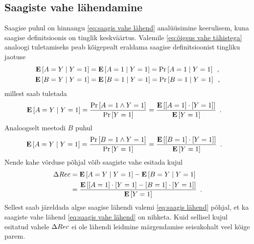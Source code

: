 \subsection{Saagiste vahe lähendamine}
Saagise puhul on hinnangu \eqref{eq:saagis vahe lähend} analüüsimine keerulisem, kuna saagise definitsioonis on tinglik keskväärtus. Valemile \eqref{eq:õigsus vahe tähistega} analoogi tuletamiseks peab kõigepealt eraldama saagise definitsioonist tingliku jaotuse
\begin{align*}
    \operatorname*{\mathbf{E}}\left[A=Y \mid Y=1\right]&=\operatorname*{\mathbf{E}}\left[A=1 \mid Y=1\right]=\Pr\left[A=1 \mid Y=1\right]\enspace, \\
    \operatorname*{\mathbf{E}}\left[B=Y \mid Y=1\right]&=\operatorname*{\mathbf{E}}\left[B=1 \mid Y=1\right]=\Pr\left[B=1 \mid Y=1\right]\enspace,
\end{align*}
millest saab tuletada
\begin{align*}
    \operatorname*{\mathbf{E}}\left[A=Y \mid Y=1\right]&=\frac{\Pr\left[A=1 \land Y=1\right]}{\Pr\left[Y=1\right]} =\frac{\operatorname*{\mathbf{E}}\left[[A=1]\cdot[Y=1]\right]}{\operatorname*{\mathbf{E}}\left[Y=1\right]} \enspace.
\end{align*}
Analoogselt meetodi $B$ puhul
\begin{align*}
    \operatorname*{\mathbf{E}}\left[A=Y \mid Y=1\right]&=\frac{\Pr\left[B=1 \land Y=1\right]}{\Pr\left[Y=1\right]} =\frac{\operatorname*{\mathbf{E}}\left[[B=1]\cdot[Y=1]\right]}{\operatorname*{\mathbf{E}}\left[Y=1\right]} \enspace.
\end{align*}
Nende kahe võrduse põhjal võib saagiste vahe esitada kujul
\begin{align*}
    \Delta Rec&=\operatorname*{\mathbf{E}}\left[A=Y \mid Y=1\right]-\operatorname*{\mathbf{E}}\left[B=Y \mid Y=1\right] \\
    &=\frac{\operatorname*{\mathbf{E}}\left[[A=1]\cdot[Y=1]-[B=1]\cdot[Y=1]\right]}{\operatorname*{\mathbf{E}}\left[Y=1\right]} \enspace.
\end{align*}
Sellest saab järeldada algse saagise lähendi valemi \eqref{eq:saagis lähend} põhjal, et ka saagiste vahe lähend \eqref{eq:saagis vahe lähend} on nihketa. Kuid sellisel kujul esitatud vahele $\Delta Rec$ ei ole lähendi leidmine märgendamise seisukohalt veel kõige parem.

